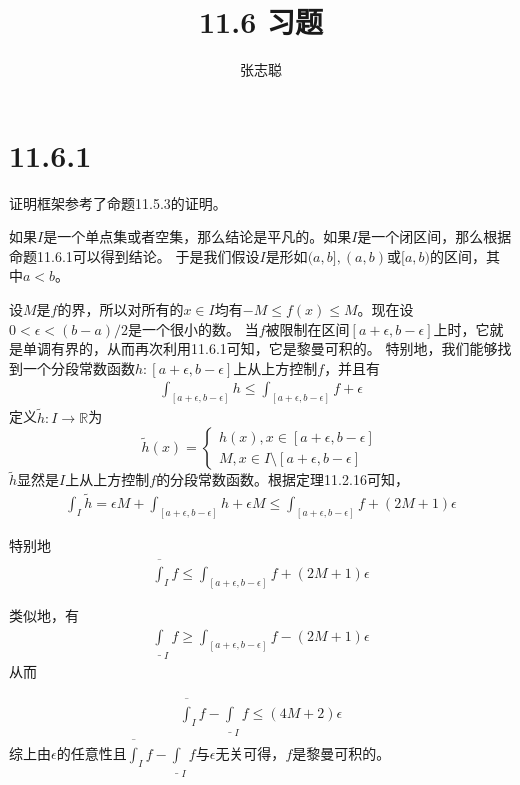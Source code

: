 \documentclass{article}
\begin{document}
\title{11.6 习题}
\author{张志聪}
\maketitle

\section*{11.6.1}

证明框架参考了命题11.5.3的证明。

如果$I$是一个单点集或者空集，那么结论是平凡的。如果$I$是一个闭区间，那么根据命题11.6.1可以得到结论。
于是我们假设$I$是形如$(a, b], (a, b)$或$[a, b)$的区间，其中$a < b$。

设$M$是$f$的界，所以对所有的$x \in I$均有$-M \leq f(x) \leq M$。现在设$0 < \epsilon < (b - a)/2$是一个很小的数。
当$f$被限制在区间$[a + \epsilon, b - \epsilon]$上时，它就是单调有界的，从而再次利用11.6.1可知，它是黎曼可积的。
特别地，我们能够找到一个分段常数函数$h: [a + \epsilon, b - \epsilon]$上从上方控制$f$，并且有
\begin{align*}
  \int_{[a + \epsilon, b - \epsilon]} h \leq \int_{[a + \epsilon, b - \epsilon]} f + \epsilon
\end{align*}
定义$\widetilde{h} : I \to \mathbb{R}$为
\begin{equation*}
  \widetilde{h}(x) =
  \begin{cases*}
    h(x), x \in [a + \epsilon, b - \epsilon] \\
    M, x \in I \setminus [a + \epsilon, b - \epsilon]
  \end{cases*}
\end{equation*}
$\widetilde{h}$显然是$I$上从上方控制$f$的分段常数函数。根据定理11.2.16可知，
\begin{align*}
  \int_{I}\widetilde{h}  = \epsilon M + \int_{[a + \epsilon, b - \epsilon]} h + \epsilon M
  \leq \int_{[a + \epsilon, b - \epsilon]} f + (2M + 1)\epsilon
\end{align*}

特别地
\begin{align*}
  \overline{\int}_I f \leq \int_{[a + \epsilon, b - \epsilon]} f + (2M + 1)\epsilon
\end{align*}

类似地，有
\begin{align*}
  \underline{\int}_I f \geq \int_{[a + \epsilon, b - \epsilon]} f - (2M + 1)\epsilon
\end{align*}
从而

\begin{align*}
  \overline{\int}_I f - \underline{\int}_I f\leq (4M + 2)\epsilon
\end{align*}
综上由$\epsilon$的任意性且$\overline{\int}_I f - \underline{\int}_I f$与$\epsilon$无关可得，$f$是黎曼可积的。
\end{document}
